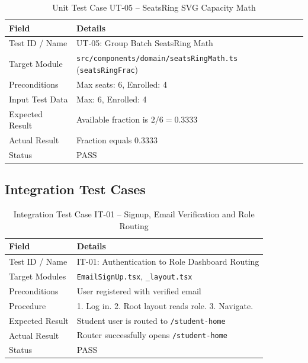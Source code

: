 \documentclass[12pt]{report}
\begin{document}
\begin{table}[H]
\centering
\caption{Unit Test Case UT-05 -- SeatsRing SVG Capacity Math}
\label{tab:ut05}
\small
\begin{tabular}{|p{3.2cm}|p{11.5cm}|}
\hline
\textbf{Field} & \textbf{Details} \\
\hline
Test ID / Name & UT-05: Group Batch SeatsRing Math \\
\hline
Target Module & \texttt{src/components/domain/seatsRingMath.ts} (\texttt{seatsRingFrac}) \\
\hline
Preconditions & Max seats: 6, Enrolled: 4 \\
\hline
Input Test Data & Max: 6, Enrolled: 4 \\
\hline
Expected Result & Available fraction is $2/6 = 0.3333$ \\
\hline
Actual Result & Fraction equals $0.3333$ \\
\hline
Status & PASS \\
\hline
\end{tabular}
\end{table}

\subsection{Integration Test Cases}

\begin{table}[H]
\centering
\caption{Integration Test Case IT-01 -- Signup, Email Verification and Role Routing}
\label{tab:it01}
\small
\begin{tabular}{|p{3.2cm}|p{11.5cm}|}
\hline
\textbf{Field} & \textbf{Details} \\
\hline
Test ID / Name & IT-01: Authentication to Role Dashboard Routing \\
\hline
Target Modules & \texttt{EmailSignUp.tsx}, \texttt{\_layout.tsx} \\
\hline
Preconditions & User registered with verified email \\
\hline
Procedure & 1. Log in. 2. Root layout reads role. 3. Navigate. \\
\hline
Expected Result & Student user is routed to \texttt{/student-home} \\
\hline
Actual Result & Router successfully opens \texttt{/student-home} \\
\hline
Status & PASS \\
\hline
\end{tabular}
\end{table}
\end{document}
